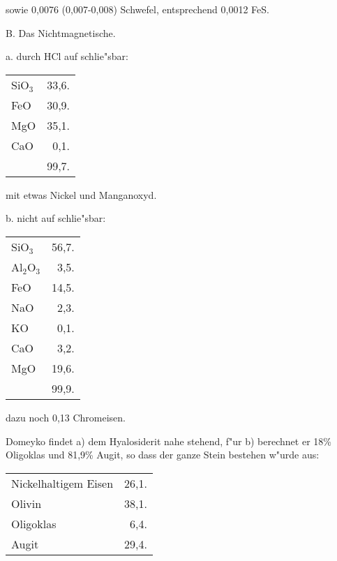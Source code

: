 \documentclass[a4paper, 11pt, oneside]{article}
\begin{document}
sowie 0,0076 (0,007-0,008) Schwefel, entsprechend 0,0012 FeS.

\begin{center}
B. Das Nichtmagnetische.
\end{center}

\begin{center}
a. durch HCl auf schlie"sbar:
\end{center}

\begin{table}[H]
    \centering
    \begin{tabular}{l r}
        SiO$_{3}$ & 33,6. \\
        FeO & 30,9. \\
        MgO & 35,1. \\
        CaO & 0,1. \\
        ~ & 99,7. \\
    \end{tabular}
\end{table}

mit etwas Nickel und Manganoxyd.

\begin{center}
b. nicht auf schlie"sbar: 
\end{center}

\begin{table}[H]
    \centering
    \begin{tabular}{l r}
        SiO$_{3}$ & 56,7. \\
        Al$_{2}$O$_{3}$ & 3,5. \\
        FeO & 14,5. \\
        NaO & 2,3. \\
        KO & 0,1. \\
        CaO & 3,2. \\
        MgO & 19,6. \\
         & 99,9. \\
    \end{tabular}
\end{table}

dazu noch 0,13 Chromeisen.

Domeyko findet a) dem Hyalosiderit nahe stehend, f"ur b) berechnet er 18\% Oligoklas und 81,9\% Augit, so dass der ganze Stein bestehen w"urde aus:

\begin{table}[H]
    \centering
    \begin{tabular}{l r}
        Nickelhaltigem Eisen & 26,1. \\
        Olivin & 38,1. \\
        Oligoklas & 6,4. \\
        Augit & 29,4. \\
    \end{tabular}
\end{table}
\end{document}
